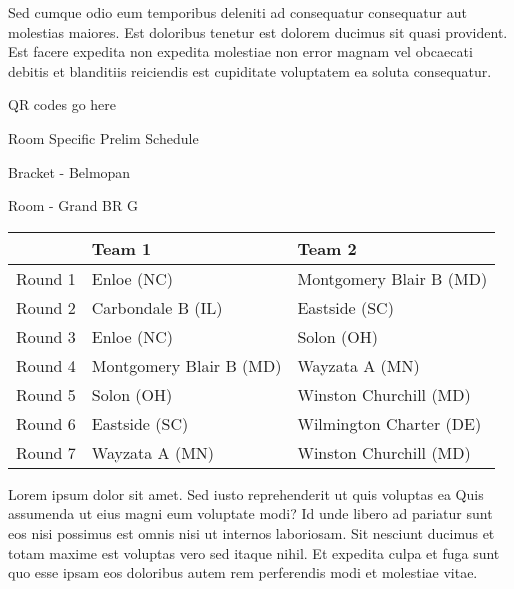 \documentclass{article}%
\begin{document}
\newline%
Sed cumque odio eum temporibus deleniti ad consequatur consequatur aut molestias maiores. Est doloribus tenetur est dolorem ducimus sit quasi provident. Est facere expedita non expedita molestiae non error magnam vel obcaecati debitis et blanditiis reiciendis est cupiditate voluptatem ea soluta consequatur.%
\vspace*{140pt}%
\begin{center}%
\begin{Huge}%
QR codes go here%
\end{Huge}%
\end{center}%
\newpage%
\begin{center}%
\begin{Huge}%
Room Specific Prelim Schedule%
\end{Huge}%
\vspace*{8pt}%
\linebreak%
\begin{Large}%
Bracket {-} Belmopan%
\end{Large}%
\vspace*{8pt}%
\linebreak%
\vspace*{8pt}%
\begin{Large}%
Room {-} Grand BR G%
\end{Large}%
\end{center}%
%
\begin{tabularx}{\textwidth}{|c|Y|Y|}%
\hline%
&Team 1&Team 2\\%
\hline%
Round 1&Enloe (NC)&Montgomery Blair B (MD)\\%
Round 2&Carbondale B (IL)&Eastside (SC)\\%
Round 3&Enloe (NC)&Solon (OH)\\%
Round 4&Montgomery Blair B (MD)&Wayzata A (MN)\\%
Round 5&Solon (OH)&Winston Churchill (MD)\\%
Round 6&Eastside (SC)&Wilmington Charter (DE)\\%
Round 7&Wayzata A (MN)&Winston Churchill (MD)\\%
\hline%
\end{tabularx}%
\vspace*{8pt}%
\newline%
Lorem ipsum dolor sit amet. Sed iusto reprehenderit ut quis voluptas ea Quis assumenda ut eius magni eum voluptate modi? Id unde libero ad pariatur sunt eos nisi possimus est omnis nisi ut internos laboriosam. Sit nesciunt ducimus et totam maxime est voluptas vero sed itaque nihil. Et expedita culpa et fuga sunt quo esse ipsam eos doloribus autem rem perferendis modi et molestiae vitae.\newline%
\end{document}
